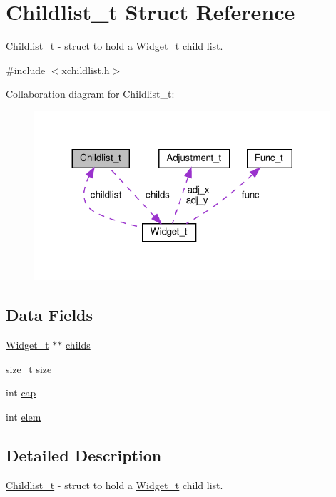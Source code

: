 \hypertarget{structChildlist__t}{}\section{Childlist\+\_\+t Struct Reference}
\label{structChildlist__t}


\hyperlink{structChildlist__t}{Childlist\+\_\+t} -\/ struct to hold a \hyperlink{structWidget__t}{Widget\+\_\+t} child list.  




{\ttfamily \#include $<$xchildlist.\+h$>$}



Collaboration diagram for Childlist\+\_\+t\+:
\nopagebreak
\begin{figure}[H]
\begin{center}
\leavevmode
\includegraphics[width=311pt]{structChildlist__t__coll__graph}
\end{center}
\end{figure}
\subsection*{Data Fields}
\begin{DoxyCompactItemize}
\item 
\hyperlink{structWidget__t}{Widget\+\_\+t} $\ast$$\ast$ \hyperlink{structChildlist__t_a093a27797dc1a2819546ceb857b3db1a}{childs}
\item 
size\+\_\+t \hyperlink{structChildlist__t_a3045339822c393689c6fac8b8a2a4457}{size}
\item 
int \hyperlink{structChildlist__t_abf81fe823696baae53ff77036227f0c8}{cap}
\item 
int \hyperlink{structChildlist__t_a5d7a8d584c55c0496e5710d9a6f4282f}{elem}
\end{DoxyCompactItemize}


\subsection{Detailed Description}
\hyperlink{structChildlist__t}{Childlist\+\_\+t} -\/ struct to hold a \hyperlink{structWidget__t}{Widget\+\_\+t} child list. 


